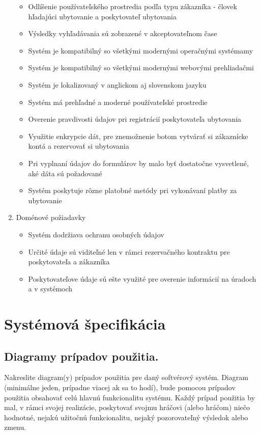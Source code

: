 \begin{enumerate}[label=\Alph*.]
    \begin{itemize}
        \item Odlíšenie používateľského prostredia podľa typu zákazníka - 
        človek hľadajúci ubytovanie a poskytovateľ ubytovania
        \item Výsledky vyhľadávania sú zobrazené v akceptovateľnom čase
        \item Systém je kompatibilný so všetkými modernými operačnými
        systémamy
        \item Systém je kompatibilný so všetkými modernými webovými 
        prehliadačmi
        \item Systém je lokalizovaný v anglickom aj slovenskom jazyku
        \item Systém má prehľadné a moderné používateľské prostredie
        \item Overenie pravdivosti údajov pri registrácií poskytovateľa 
        ubytovania
        \item Využitie enkrypcie dát, pre znemožnenie botom vytvárať si 
        zákaznícke kontá a rezervovať si ubytovania
        \item Pri vyplnaní údajov do formulárov by malo byť dostatočne 
        vysvetlené, aké dáta sú požadované
        \item Systém poskytuje rôzne platobné metódy pri vykonávaní platby za 
        ubytovanie
    \end{itemize}
    \item Doménové požiadavky
    \begin{itemize}
        \item Systém dodržiava ochranu osobných údajov
        \item Určité údaje sú viditeľné len v rámci rezervačného kontraktu 
        pre poskytovateľa a zákazníka
        \item Poskytovateľove údaje sú ešte využité pre overenie informácií na 
        úradoch a v systémoch
    \end{itemize}
\end{enumerate}


\section{Systémová špecifikácia}

\subsection{Diagramy prípadov použitia.}
Nakreslite diagram(y) prípadov použitia pre daný softvérový
systém. Diagram (minimálne jeden, prípadne viacej ak sa to hodí), bude pomocou prípadov
použitia obsahovať celú hlavnú funkcionalitu systému. Každý prípad použitia by mal, v rámci
svojej realizácie, poskytovať svojmu hráčovi (alebo hráčom) niečo hodnotné, nejakú užitočnú
funkcionalitu, nejaký pozorovateľný výsledok alebo zmenu.

